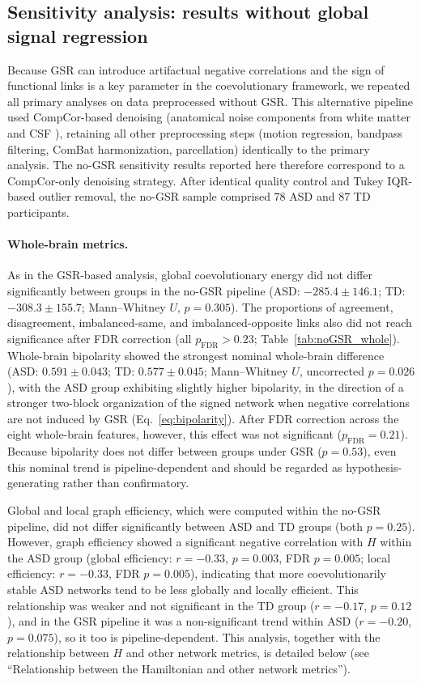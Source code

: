 \documentclass[10pt,letterpaper]{article}
\begin{document}
\subsection*{Sensitivity analysis: results without global signal regression}

Because GSR can introduce artifactual negative correlations \cite{Murphy2009,Fox2009,Chang2009}
and the sign of functional links is a key parameter in the coevolutionary framework, we repeated
all primary analyses on data preprocessed without GSR. This alternative pipeline used CompCor-based
denoising (anatomical noise components from white matter and CSF \cite{Behzadi2007}), retaining all
other preprocessing steps (motion regression, bandpass filtering, ComBat harmonization, parcellation)
identically to the primary analysis. The no-GSR sensitivity results reported here therefore
correspond to a CompCor-only denoising strategy. After identical quality control and Tukey IQR-based
outlier removal, the no-GSR sample comprised 78 ASD and 87 TD participants.

\paragraph*{Whole-brain metrics.}
As in the GSR-based analysis, global coevolutionary energy did not differ significantly
between groups in the no-GSR pipeline (ASD: $-285.4 \pm 146.1$; TD: $-308.3 \pm 155.7$;
Mann--Whitney $U$, $p = 0.305$). The proportions of agreement, disagreement,
imbalanced-same, and imbalanced-opposite links also did not reach significance after FDR correction
(all $p_{\mathrm{FDR}} > 0.23$; Table~\ref{tab:noGSR_whole}). Whole-brain bipolarity showed the
strongest nominal whole-brain difference (ASD: $0.591 \pm 0.043$; TD: $0.577 \pm 0.045$;
Mann--Whitney $U$, uncorrected $p = 0.026$), with the ASD group exhibiting slightly higher bipolarity,
in the direction of a stronger two-block organization of the signed network when negative
correlations are not induced by GSR (Eq.~\ref{eq:bipolarity}). After FDR correction across the eight
whole-brain features, however, this effect was not significant ($p_{\mathrm{FDR}} = 0.21$). Because
bipolarity does not differ between groups under GSR ($p = 0.53$), even this nominal trend is
pipeline-dependent and should be regarded as hypothesis-generating rather than confirmatory.

Global and local graph efficiency, which were computed within the no-GSR pipeline, did not differ
significantly between ASD and TD groups (both $p = 0.25$). However, graph efficiency showed a
significant negative correlation with $H$ within the ASD group (global efficiency: $r = -0.33$,
$p = 0.003$, FDR $p = 0.005$; local efficiency: $r = -0.33$, FDR $p = 0.005$), indicating that more
coevolutionarily stable ASD networks tend to be less globally and locally efficient. This
relationship was weaker and not significant in the TD group ($r = -0.17$, $p = 0.12$), and in the
GSR pipeline it was a non-significant trend within ASD ($r = -0.20$, $p = 0.075$), so it too is
pipeline-dependent. This analysis, together with the relationship between $H$ and
other network metrics, is detailed below (see ``Relationship between the Hamiltonian and other
network metrics'').
\end{document}
